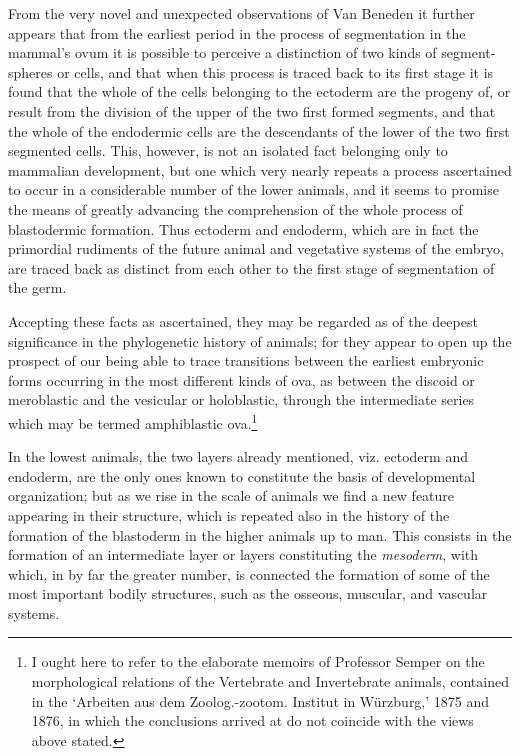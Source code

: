 \documentclass[a4paper, 11pt, oneside, english]{article}
\begin{document}
From the very novel and unexpected observations of Van Beneden it further appears that from the earliest period in the process of segmentation in the mammal's ovum it is possible to perceive a distinction of two kinds of segment-spheres or cells, and that when this process is traced back to its first stage it is found that the whole of the cells belonging to the ectoderm are the progeny of, or result from the division of the upper of the two first formed segments, and that the whole of the endodermic cells are the descendants of the lower of the two first segmented cells. This, however, is not an isolated fact belonging only to mammalian development, but one which very nearly repeats a process ascertained to occur in a considerable number of the lower animals, and it seems to promise the means of greatly advancing the comprehension of the whole process of blastodermic formation. Thus ectoderm and endoderm, which are in fact the primordial rudiments of the future animal and vegetative systems of the embryo, are traced back as distinct from each other to the first stage of segmentation of the germ.

Accepting these facts as ascertained, they may be regarded as of the deepest significance in the phylogenetic history of animals; for they appear to open up the prospect of our being able to trace transitions between the earliest embryonic forms occurring in the most different kinds of ova, as between the discoid or meroblastic and the vesicular or holoblastic, through the intermediate series which may be termed amphiblastic ova.\footnote{I ought here to refer to the elaborate memoirs of Professor Semper on the morphological relations of the Vertebrate and Invertebrate animals, contained in the `Arbeiten aus dem Zoolog.-zootom. Institut in Würzburg,' 1875 and 1876, in which the conclusions arrived at do not coincide with the views above stated.}

In the lowest animals, the two layers already mentioned, viz. ectoderm and endoderm, are the only ones known to constitute the basis of developmental organization; but as we rise in the scale of animals we find a new feature appearing in their structure, which is repeated also in the history of the formation of the blastoderm in the higher animals up to man. This consists in the formation of an intermediate layer or layers constituting the \emph{mesoderm}, with which, in by far the greater number, is connected the formation of some of the most important bodily structures, such as the osseous, muscular, and vascular systems.
\end{document}
